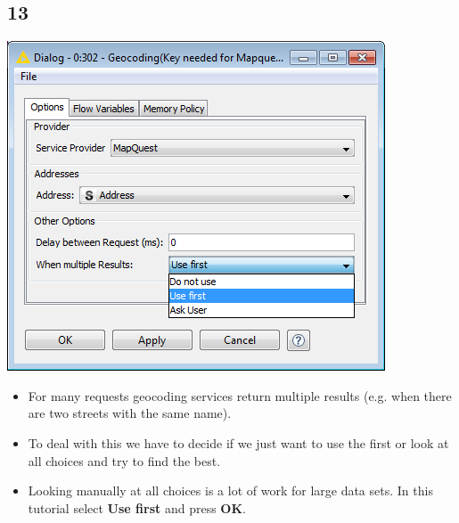 \documentclass{beamer}
\begin{document}
\subsection{13}
\begin{frame}
	\begin{center}
  		\includegraphics[height=0.5\textheight]{13.png}
	\end{center}
	\begin{itemize}
		\item For many requests geocoding services return multiple results (e.g. when there are two streets with the same name).
		\item To deal with this we have to decide if we just want to use the first or look at all choices and try to find the best.
		\item Looking manually at all choices is a lot of work for large data sets. In this tutorial select \textbf{Use first} and press \textbf{OK}.
	\end{itemize}
\end{frame}
\end{document}
